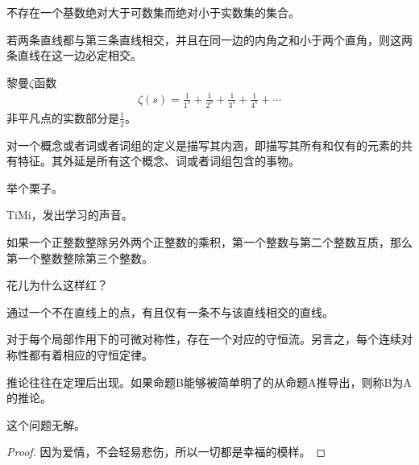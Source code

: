 \begin{assumption}[连续统假设]
    不存在一个基数绝对大于可数集而绝对小于实数集的集合。
\end{assumption}
\begin{axiom}[平行公理]
    若两条直线都与第三条直线相交，并且在同一边的内角之和小于两个直角，则这两条直线在这一边必定相交。
\end{axiom}
\begin{conjecture}[黎曼猜想]
    黎曼$\zeta$函数
    \begin{align}
        \zeta(s) = \frac{1}{1^s} + \frac{1}{2^s} + \frac{1}{3^s} + \frac{1}{4^s} + \cdots
    \end{align}
    非平凡点的实数部分是$\frac{1}{2}$。
\end{conjecture}
\begin{definition}[定义的定义]
    对一个概念或者词或者词组的定义是描写其内涵，即描写其所有和仅有的元素的共有特征。其外延是所有这个概念、词或者词组包含的事物。
\end{definition}
\begin{example}
    举个栗子。
\end{example}
\begin{exercise}
    TiMi，发出学习的声音。
\end{exercise}
\begin{lemma}[欧几里得引理]
    如果一个正整数整除另外两个正整数的乘积，第一个整数与第二个整数互质，那么第一个整数整除第三个整数。
\end{lemma}
\begin{problem}
    花儿为什么这样红？
\end{problem}
\begin{proposition}
    通过一个不在直线上的点，有且仅有一条不与该直线相交的直线。
\end{proposition}
\begin{theorem}[诺特定理]
    对于每个局部作用下的可微对称性，存在一个对应的守恒流。另言之，每个连续对称性都有着相应的守恒定律。
\end{theorem}
\begin{corollary}
    推论往往在定理后出现。如果命题B能够被简单明了的从命题A推导出，则称B为A的推论。
\end{corollary}
\begin{solution}
    这个问题无解。
\end{solution}
\begin{proof}
    因为爱情，不会轻易悲伤，所以一切都是幸福的模样。
\end{proof}

